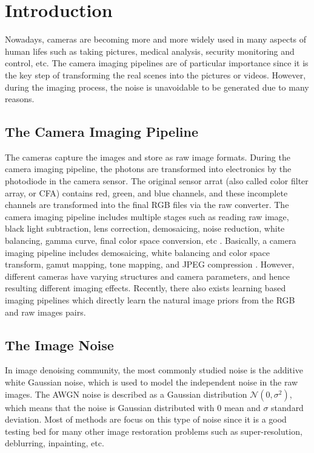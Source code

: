 %
\chapter{Introduction}
\label{sec:intro}



Nowadays, cameras are becoming more and more widely used in many aspects of human lifes such as taking pictures, medical analysis, security monitoring and control, etc. The camera imaging pipelines are of particular importance since it is the key step of transforming the real scenes into the pictures or videos. However, during the imaging process, the noise is unavoidable to be generated due to many reasons.

\section{The Camera Imaging Pipeline}
\label{sec:intro:general}

The cameras capture the images and store as raw image formats. During the camera imaging pipeline, the photons are transformed into electronics by the photodiode in the camera sensor. The original sensor arrat (also called color filter array, or CFA) contains red, green, and blue channels, and these incomplete channels are transformed into the final RGB files via the raw converter. The camera imaging pipeline includes multiple stages such as reading raw image, black light subtraction, lens correction, demosaicing, noise reduction, white balancing, gamma curve, final color space conversion, etc \cite{browneccv2016}. Basically, a camera imaging pipeline includes demosaicing, white balancing and color space transform, gamut mapping, tone mapping, and JPEG compression \cite{crosschannel}. However, different cameras have varying structures and camera parameters, and hence resulting different imaging effects. Recently, there also exists learning based imaging pipelines which directly learn the  natural image priors from the RGB and raw images pairs.


\section{The Image Noise}
\label{sec:intro:current}

In image denoising community, the most commonly studied noise is the additive white Gaussian noise, which is used to model the independent noise in the raw images. The AWGN noise is described as a Gaussian distribution $\mathcal{N}(0,\sigma^{2})$, which means that the noise is Gaussian distributed with $0$ mean and $\sigma$ standard deviation. Most of methods are focus on this type of noise since it is a good testing bed for many other image restoration problems such as super-resolution, deblurring, inpainting, etc.

